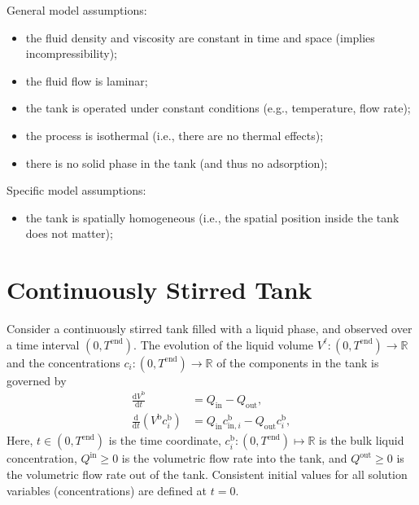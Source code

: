 \documentclass{article}
\begin{document}
General model assumptions:
\begin{itemize}
\item the fluid density and viscosity are constant in time and space (implies incompressibility);
\item the fluid flow is laminar;
\item the tank is operated under constant conditions (e.g., temperature, flow rate);
\item the process is isothermal (i.e., there are no thermal effects);
\item there is no solid phase in the tank (and thus no adsorption);
\end{itemize}


Specific model assumptions:
\begin{itemize}
\item the tank is spatially homogeneous (i.e., the spatial position inside the tank does not matter);
\end{itemize}


\section*{Continuously Stirred Tank}
Consider a continuously stirred tank filled with a liquid phase, and observed over a time interval $(0, T^{\mathrm{end}})$.
The evolution of the liquid volume $V^{\mathrm{\ell}}\colon (0, T^{\mathrm{end}}) \to \mathbb{R}$ and the concentrations $c_i\colon (0, T^{\mathrm{end}}) \to \mathbb{R}$ of the components in the tank is governed by
\begin{align}

    \frac{\mathrm{d}V^{\mathrm{b}}}{\mathrm{d}t} &= Q_{\mathrm{in}} - Q_{\mathrm{out}},
    \\
    \frac{\mathrm{d}}{\mathrm{d} t} \left( V^{\mathrm{b}} c^{\mathrm{b}}_i \right)&= Q_{\mathrm{in}} c^{\mathrm{b}}_{\mathrm{in},i} - Q_{\mathrm{out}} c^{\mathrm{b}}_i,
\end{align}
Here, $t\in (0, T^{\mathrm{end}})$ is the time coordinate, $c^{\mathrm{b}}_i\colon (0, T^\mathrm{end}) \mapsto \mathbb{R}$ is the bulk liquid concentration, $Q^\mathrm{in}\geq 0$ is the volumetric flow rate into the tank, and $Q^\mathrm{out}\geq 0$ is the volumetric flow rate out of the tank.
Consistent initial values for all solution variables (concentrations) are defined at $t = 0$.
\end{document}
